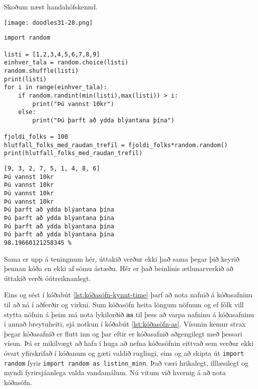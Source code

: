 Skoðum næst handahófskennd.

\phantom{easter egg}
\begin{center}
	\texttt{[image: doodles31-28.png]}
\end{center}
\newpage

\begin{lstlisting}[caption=Notkun kóðasafna með random, label=lst:kóðasöfn-kynnt-rand]
import random

listi = [1,2,3,4,5,6,7,8,9]
einhver_tala = random.choice(listi)
random.shuffle(listi)
print(listi)
for i in range(einhver_tala):
	if random.randint(min(listi),max(listi)) > i:
		print("Þú vannst 10kr")
	else:
		print("Þú þarft að ydda blýantana þína")

fjoldi_folks = 100
hlutfall_folks_med_raudan_trefil = fjoldi_folks*random.random()
print(hlutfall_folks_med_raudan_trefil)
\end{lstlisting}
\lstset{style=uttak}
\begin{lstlisting}
[9, 3, 2, 7, 5, 1, 4, 8, 6]
Þú vannst 10kr
Þú vannst 10kr
Þú vannst 10kr
Þú vannst 10kr
Þú þarft að ydda blýantana þína
Þú þarft að ydda blýantana þína
Þú þarft að ydda blýantana þína
Þú þarft að ydda blýantana þína
98.19660121258345 %
\end{lstlisting}
\lstset{style=venjulegt}

Sama er upp á teningnum hér, úttakið verður ekki það sama þegar þið keyrið þennan kóða en ekki af sömu ástæðu.
Hér er það beinlínis ætlunarverkið að úttakið verði óútreiknanlegt.



Eins og sést í kóðabút \ref{lst:kóðasöfn-kynnt-time} þarf að nota nafnið á kóðasafninu til að ná í aðferðir og virkni.
Sum kóðasöfn heita löngum nöfnum og ef fólk vill stytta nöfnin á þeim má nota lykilorðið \textbf{as} til þess að varpa nafninu á kóðasafninu í annað breytuheiti, sjá notkun í kóðabút \ref{lst:kóðasöfn-as}.
Vísunin kemur strax þegar kóðasafnið er flutt inn og þar eftir er kóðasafnið aðgengilegt með þessari vísun.
Þá er mikilvægt að hafa í huga að nefna kóðasöfnin eittvað sem verður ekki óvart yfirskrifað í kóðanum og gæti valdið ruglingi, eins og að skipta út \texttt{import random} fyrir \texttt{import random as listinn\_minn}.
Það væri hrikalegt, illlæsilegt og myndi fyrirsjáanlega valda vandamálum.
Nú vitum við hvernig á að nota kóðasöfn.

